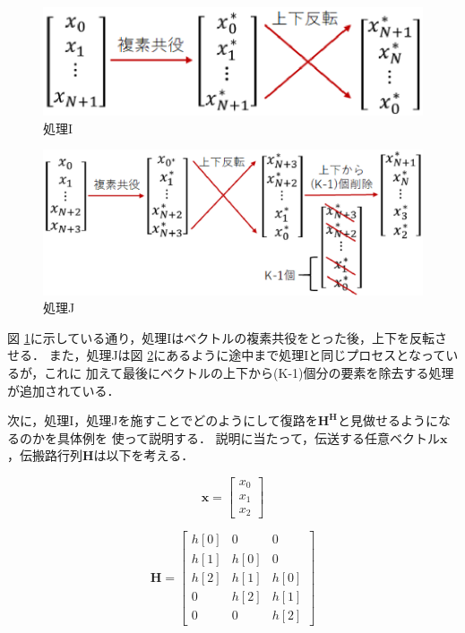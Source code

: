 \begin{figure}
    \centering
    \includegraphics[width=0.6\linewidth]{chapter3/figure/ProcI.eps}
    \caption{処理I}
    \label{figProcI}
\end{figure}
\begin{figure}
    \centering
    \includegraphics[width=0.7\linewidth]{chapter3/figure/ProcJ.eps}
    \caption{処理J}
    \label{figProcJ}
\end{figure}

図 \ref{figProcI}に示している通り，処理Iはベクトルの複素共役をとった後，上下を反転させる．
また，処理Jは図 \ref{figProcJ}にあるように途中まで処理Iと同じプロセスとなっているが，これに
加えて最後にベクトルの上下から(K-1)個分の要素を除去する処理が追加されている．

次に，処理I，処理Jを施すことでどのようにして復路を$\bm{H^H}$と見做せるようになるのかを具体例を
使って説明する．
説明に当たって，伝送する任意ベクトル$\bm{x}$，伝搬路行列$\bm{H}$は以下を考える．

\begin{equation}
    \bm{x} = \left[
        \begin{array}{c}
            x_0 \\
            x_1 \\
            x_2
        \end{array}
    \right]
\end{equation}

\begin{equation}
    \bm{H} = \left[
        \begin{array}{ccc}
            h[0] & 0 & 0 \\
            h[1] & h[0] & 0 \\
            h[2] & h[1] & h[0] \\
            0 & h[2] & h[1] \\
            0 & 0 & h[2]
        \end{array}
    \right]
\end{equation}

